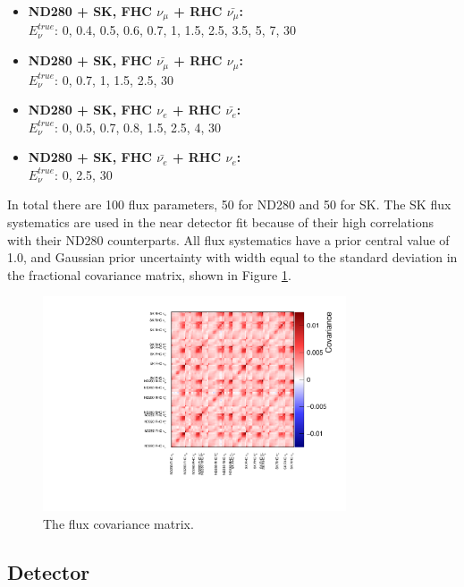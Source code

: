 \begin{itemize}

\item \textbf{ND280 + SK, FHC $\nu_\mu$ + RHC $\bar{\nu_\mu}$:}\\
$E^{true}_{\nu}$: 0, 0.4, 0.5, 0.6, 0.7, 1, 1.5, 2.5, 3.5, 5, 7, 30

\item \textbf{ND280 + SK, FHC $\bar{\nu_\mu}$ + RHC $\nu_\mu$:}\\
$E^{true}_{\nu}$: 0, 0.7, 1, 1.5, 2.5, 30

\item \textbf{ND280 + SK, FHC $\nu_e$ + RHC $\bar{\nu_e}$:}\\
$E^{true}_{\nu}$: 0, 0.5, 0.7, 0.8, 1.5, 2.5, 4, 30

\item \textbf{ND280 + SK, FHC $\bar{\nu_e}$ + RHC $\nu_e$:}\\
$E^{true}_{\nu}$: 0, 2.5, 30

\end{itemize}

In total there are 100 flux parameters, 50 for ND280 and 50 for SK. The SK flux systematics are used in the near detector fit because of their high correlations with their ND280 counterparts. All flux systematics have a prior central value of 1.0, and Gaussian prior uncertainty with width equal to the standard deviation in the fractional covariance matrix, shown in Figure \ref{fig:fluxcov}.

\begin{figure}[!htbp]
\centering
\includegraphics*[width=0.8\textwidth,clip]{figs/fluxcov}
\caption{The flux covariance matrix.}\label{fig:fluxcov}
\end{figure}

\subsection{Detector}\label{sec:det}

